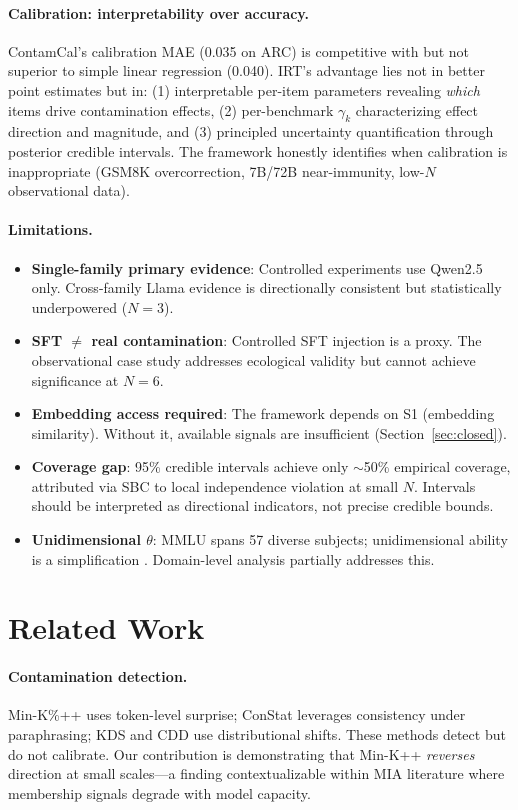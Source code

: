 \documentclass[11pt]{article}
\begin{document}
\paragraph{Calibration: interpretability over accuracy.} ContamCal's calibration MAE (0.035 on ARC) is competitive with but not superior to simple linear regression (0.040). IRT's advantage lies not in better point estimates but in: (1) interpretable per-item parameters revealing \emph{which} items drive contamination effects, (2) per-benchmark $\gamma_k$ characterizing effect direction and magnitude, and (3) principled uncertainty quantification through posterior credible intervals. The framework honestly identifies when calibration is inappropriate (GSM8K overcorrection, 7B/72B near-immunity, low-$N$ observational data).

\paragraph{Limitations.}
\begin{itemize}
    \item \textbf{Single-family primary evidence}: Controlled experiments use Qwen2.5 only. Cross-family Llama evidence is directionally consistent but statistically underpowered ($N=3$).
    \item \textbf{SFT $\neq$ real contamination}: Controlled SFT injection is a proxy. The observational case study addresses ecological validity but cannot achieve significance at $N=6$.
    \item \textbf{Embedding access required}: The framework depends on S1 (embedding similarity). Without it, available signals are insufficient (Section~\ref{sec:closed}).
    \item \textbf{Coverage gap}: 95\% credible intervals achieve only $\sim$50\% empirical coverage, attributed via SBC to local independence violation at small $N$. Intervals should be interpreted as directional indicators, not precise credible bounds.
    \item \textbf{Unidimensional $\theta$}: MMLU spans 57 diverse subjects; unidimensional ability is a simplification \citep{reckase2009multidimensional}. Domain-level analysis partially addresses this.
\end{itemize}

\section{Related Work}

\paragraph{Contamination detection.} Min-K\%++ \citep{shi2024detecting} uses token-level surprise; ConStat \citep{dekoninck2024constat} leverages consistency under paraphrasing; KDS and CDD use distributional shifts. These methods detect but do not calibrate. Our contribution is demonstrating that Min-K++ \emph{reverses} direction at small scales---a finding contextualizable within MIA literature \citep{shokri2017membership,carlini2022quantifying} where membership signals degrade with model capacity.
\end{document}
